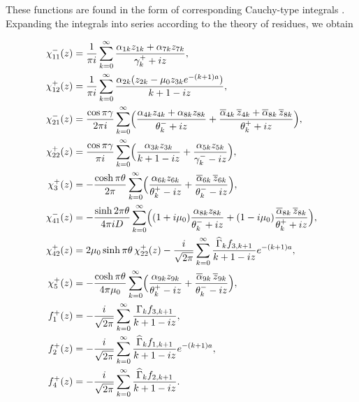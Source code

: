 These functions are found in the form of corresponding Cauchy-type integrals \cite{Ostryk73}. Expanding the integrals into series according to the theory of residues, we obtain

\begin{equation}\label{Ostryk_Eq_23_} 
\begin{aligned}
	\chi_{11}^{-}(z)&=\displaystyle\frac{1}{\pi i}\sum_{k=0}^{\infty}\frac{\alpha_{1k}z_{1k}+\alpha_{7k}z_{7k}}{\gamma_{k}^{+}+iz},\\
	\chi_{12}^{+}(z)&=\displaystyle\frac{1}{\pi i}\sum_{k=0}^{\infty}\frac{\alpha_{2k}(z_{2k}-\mu_{0}z_{3k}e^{-(k+1)a})}{k+1-iz},\\
	\chi_{21}^{-}(z)&=\displaystyle\frac{\cos\pi\gamma}{2\pi i}\sum_{k=0}^{\infty}\Bigl(\frac{\alpha_{4k}z_{4k}+\alpha_{8k}z_{8k}}{\theta_{k}^{-}+iz}+\frac{\overline{\alpha}_{4k}\,\overline{z}_{4k}+\overline{\alpha}_{8k}\,\overline{z}_{8k}}{\theta_{k}^{+}+iz}\Bigr),\\
	\chi_{22}^{+}(z)&=\displaystyle\frac{\cos\pi\gamma}{\pi i}\sum_{k=0}^{\infty}\Bigl(\frac{\alpha_{3k}z_{3k}}{k+1-iz}+\frac{\alpha_{5k}z_{5k}}{\gamma_{k}^{-}-iz}\Bigr),\\
	\chi_{3}^{+}(z)&=\displaystyle -\frac{\cosh\pi\theta}{2\pi}\sum_{k=0}^{\infty}\Bigl(\frac{\alpha_{6k}z_{6k}}{\theta_{k}^{+}-iz}+\frac{\overline{\alpha}_{6k}\,\overline{z}_{6k}}{\theta_{k}^{-}-iz}\Bigr),\\
	\chi_{41}^{-}(z)&=\displaystyle -\frac{\sinh2\pi\theta}{4\pi iD}\sum_{k=0}^{\infty}\Bigl((1+i\mu_{0})\frac{\alpha_{8k}z_{8k}}{\theta_{k}^{-}+iz}+(1-i\mu_{0})\frac{\overline{\alpha}_{8k}\,\overline{z}_{8k}}{\theta_{k}^{+}+iz}\Bigr),\\
	\chi_{42}^{+}(z)&=\displaystyle 2\mu_{0}\sinh\pi\theta\,\chi_{22}^{+}(z)-\frac{i}{\sqrt{2\pi}}\sum_{k=0}^{\infty}\frac{\widehat{\Gamma}_{k}f_{3,k+1}}{k+1-iz}e^{-(k+1)a},\\
	\chi_{5}^{+}(z)&=\displaystyle -\frac{\cosh\pi\theta}{4\pi\mu_{0}}\sum_{k=0}^{\infty}\Bigl(\frac{\alpha_{9k}z_{9k}}{\theta_{k}^{+}-iz}+\frac{\overline{\alpha}_{9k}\,\overline{z}_{9k}}{\theta_{k}^{-}-iz}\Bigr),\\
	f_{1}^{+}(z)&=\displaystyle -\frac{i}{\sqrt{2\pi}}\sum_{k=0}^{\infty}\frac{\Gamma_{k}f_{3,k+1}}{k+1-iz},\\
	f_{2}^{+}(z)&=\displaystyle -\frac{i}{\sqrt{2\pi}}\sum_{k=0}^{\infty}\frac{\widehat{\Gamma}_{k}f_{1,k+1}}{k+1-iz}e^{-(k+1)a},\\
	f_{4}^{+}(z)&=\displaystyle -\frac{i}{\sqrt{2\pi}}\sum_{k=0}^{\infty}\frac{\widehat{\Gamma}_{k}f_{2,k+1}}{k+1-iz}.
\end{aligned}
\end{equation}
